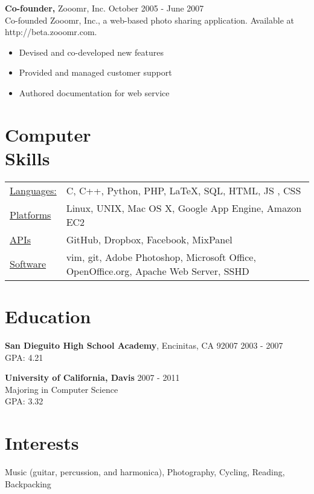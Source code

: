 \documentclass[margin]{res}
\begin{document}
\begin{resume}
 {\bf Co-founder,} Zooomr, Inc. \hfill October 2005 - June 2007 \\
 Co-founded Zooomr, Inc., a web-based photo sharing application.  Available at http://beta.zooomr.com.
 \begin{itemize}
 \item Devised and co-developed new features
 \item Provided and managed customer support
 \item Authored documentation for web service
 \end{itemize} 

\section{Computer \\ Skills}
   \begin{tabular}{l p{3in}}
   \underline{Languages:} & C, C++, Python, PHP, \LaTeX, SQL, HTML, JS , CSS  \\
   \underline{Platforms} & Linux, UNIX, Mac OS X, Google App Engine, Amazon EC2\\
   \underline{APIs} & GitHub, Dropbox, Facebook, MixPanel\\
   \underline{Software} & vim, git, Adobe Photoshop, Microsoft Office, OpenOffice.org, Apache Web Server, SSHD\\

 \end{tabular}

\section{Education} 
{\bf San Dieguito High School Academy}, Encinitas, CA 92007 \hfill 2003 - 2007 \\
 GPA: 4.21

{\bf University of California, Davis}  \hfill 2007 - 2011\\
Majoring in Computer Science \\
GPA: 3.32

\section{Interests}
Music (guitar, percussion, and harmonica), Photography, Cycling, Reading, Backpacking

\end{resume} 
\end{document}
